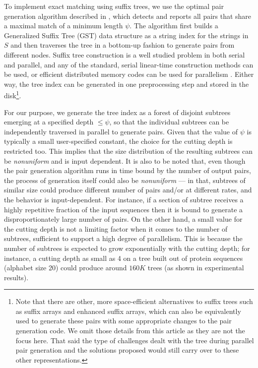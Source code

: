 \documentclass[10pt,journal,letterpaper,compsoc]{IEEEtran}
\begin{document}
To implement exact matching using suffix trees, we use the optimal pair generation algorithm described in \cite{Kalyanaraman07}, which detects and reports all pairs that share a maximal match of a minimum length $\psi$. The algorithm first builds a Generalized Suffix Tree (GST) data structure \cite{Weiner73} as a string index for the strings in $S$ and then traverses the tree in a bottom-up fashion to generate pairs from different nodes. Suffix tree construction is a well studied problem in both serial and parallel, and any of the standard, serial linear-time construction methods \cite{McCreight76,Ukkonen90,Weiner73} can be used, or efficient distributed memory codes can be used for parallelism \cite{Ghoting09,Kalyanaraman07}.  Either way, the tree index can be generated in one preprocessing step and stored in the disk\footnote{Note that there are other, more space-efficient alternatives to suffix trees such as suffix arrays and enhanced suffix arrays, which can also be equivalently used to generate these pairs with some appropriate changes to the pair generation code. We omit those details from this article as they are not the focus here. That said the type of challenges dealt with the tree during parallel pair generation and the solutions proposed would still carry over to these other representations.}. 

For our purpose, we generate the tree index as a forest of disjoint subtrees emerging at a specified depth $\leq\psi$, so that the individual subtrees can be independently traversed in parallel to generate pairs. Given that the value of $\psi$ is typically a small user-specified constant, the choice for the cutting depth is restricted too. This implies that the size distribution of the resulting subtrees can be \emph{nonuniform} and is input dependent. It is also to be noted that, even though the pair generation algorithm runs in time bound by the number of output pairs, the process of generation itself could also be \emph{nonuniform} --- in that, subtrees of similar size could produce different number of pairs and/or at different rates, and the behavior is input-dependent. For instance, if a section of subtree receives a highly repetitive fraction of the input sequences then it is bound to generate a disproportionately large number of pairs.  On the other hand, a small value for the cutting depth is not a limiting factor when it comes to the number of subtrees, sufficient to support a high degree of parallelism. This is because the number of subtrees is expected to grow exponentially with the cutting depth; for instance, a cutting depth as small as 4 on a tree built out of protein sequences (alphabet size 20) could produce around $160K$ trees (as shown in experimental results). 
\end{document}
